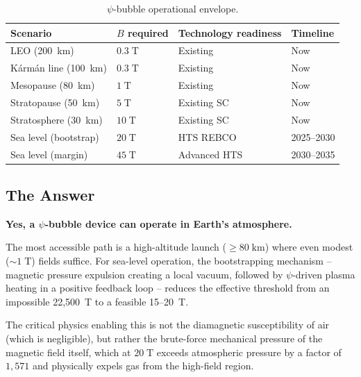 \documentclass[11pt,a4paper]{article}
\begin{document}
\begin{table}[h]
\centering
\caption{$\psi$-bubble operational envelope.}
\renewcommand{\arraystretch}{1.15}
\begin{tabular}{llll}
\toprule
Scenario & $B$ required & Technology readiness & Timeline \\
\midrule
LEO (200~km) & $0.3\;\mathrm{T}$ & Existing & Now \\
K\'arm\'an line (100~km) & $0.3\;\mathrm{T}$ & Existing & Now \\
Mesopause (80~km) & $1\;\mathrm{T}$ & Existing & Now \\
Stratopause (50~km) & $5\;\mathrm{T}$ & Existing SC & Now \\
Stratosphere (30~km) & $10\;\mathrm{T}$ & Existing SC & Now \\
Sea level (bootstrap) & $20\;\mathrm{T}$ & HTS REBCO & 2025--2030 \\
Sea level (margin) & $45\;\mathrm{T}$ & Advanced HTS & 2030--2035 \\
\bottomrule
\end{tabular}
\end{table}

\subsection{The Answer}

\textbf{Yes, a $\psi$-bubble device can operate in Earth's atmosphere.}

The most accessible path is a high-altitude launch ($\geq 80\;\mathrm{km}$) where
even modest ($\sim 1\;\mathrm{T}$) fields suffice. For sea-level operation, the
bootstrapping mechanism -- magnetic pressure expulsion creating a local vacuum,
followed by $\psi$-driven plasma heating in a positive feedback loop -- reduces
the effective threshold from an impossible 22,500~T to a feasible 15--20~T.

The critical physics enabling this is not the diamagnetic susceptibility of air
(which is negligible), but rather the brute-force mechanical pressure of the
magnetic field itself, which at $20\;\mathrm{T}$ exceeds atmospheric pressure by
a factor of $1{,}571$ and physically expels gas from the high-field region.
\end{document}
